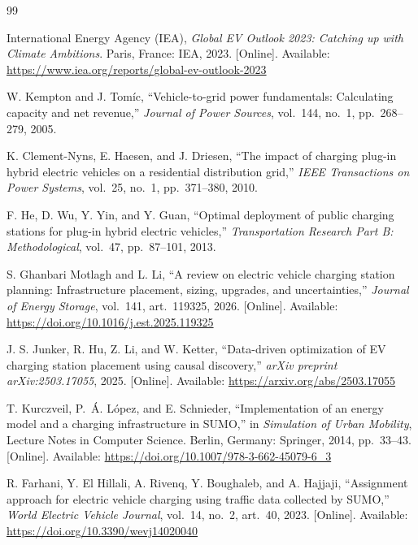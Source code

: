 

\begin{thebibliography}{99}

    International Energy Agency (IEA),
    \textit{Global EV Outlook 2023: Catching up with Climate Ambitions}.
    Paris, France: IEA, 2023. [Online]. Available:
    \url{https://www.iea.org/reports/global-ev-outlook-2023}

    W. Kempton and J. Tom\'{i}c,
    ``Vehicle-to-grid power fundamentals: Calculating capacity and net revenue,''
    \textit{Journal of Power Sources}, vol.~144, no.~1, pp.~268--279, 2005.

    K. Clement-Nyns, E. Haesen, and J. Driesen,
    ``The impact of charging plug-in hybrid electric vehicles on a residential distribution grid,''
    \textit{IEEE Transactions on Power Systems}, vol.~25, no.~1, pp.~371--380, 2010.

    F. He, D. Wu, Y. Yin, and Y. Guan,
    ``Optimal deployment of public charging stations for plug-in hybrid electric vehicles,''
    \textit{Transportation Research Part B: Methodological}, vol.~47, pp.~87--101, 2013.

    S. Ghanbari Motlagh and L. Li,
    ``A review on electric vehicle charging station planning: Infrastructure placement, sizing, upgrades, and uncertainties,''
    \textit{Journal of Energy Storage}, vol.~141, art.~119325, 2026. [Online]. Available:
    \url{https://doi.org/10.1016/j.est.2025.119325}

    J. S. Junker, R. Hu, Z. Li, and W. Ketter,
    ``Data-driven optimization of EV charging station placement using causal discovery,''
    \textit{arXiv preprint arXiv:2503.17055}, 2025. [Online]. Available:
    \url{https://arxiv.org/abs/2503.17055}

    T. Kurczveil, P.~\'{A}. L\'{o}pez, and E. Schnieder,
    ``Implementation of an energy model and a charging infrastructure in SUMO,''
    in \textit{Simulation of Urban Mobility}, Lecture Notes in Computer Science.
    Berlin, Germany: Springer, 2014, pp.~33--43. [Online]. Available:
    \url{https://doi.org/10.1007/978-3-662-45079-6_3}

    R. Farhani, Y. El Hillali, A. Rivenq, Y. Boughaleb, and A. Hajjaji,
    ``Assignment approach for electric vehicle charging using traffic data collected by SUMO,''
    \textit{World Electric Vehicle Journal}, vol.~14, no.~2, art.~40, 2023. [Online]. Available:
    \url{https://doi.org/10.3390/wevj14020040}


\end{thebibliography}
